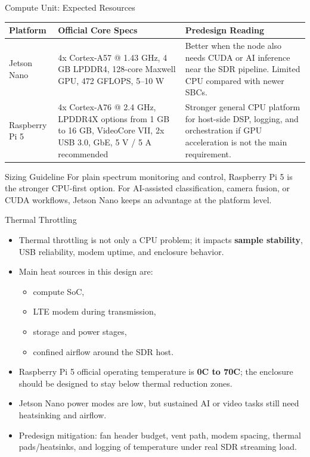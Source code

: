 \documentclass{beamer}
\begin{document}
\begin{frame}{Compute Unit: Expected Resources}
    \scriptsize
    \begin{tabularx}{\textwidth}{>{\raggedright\arraybackslash}p{} >{\raggedright\arraybackslash}p{} X}
        \toprule
        \textbf{Platform} & \textbf{Official Core Specs} & \textbf{Predesign Reading} \\
        \midrule
        Jetson Nano & 4x Cortex-A57 @ 1.43 GHz, 4 GB LPDDR4, 128-core Maxwell GPU, 472 GFLOPS, 5--10 W & Better when the node also needs CUDA or AI inference near the SDR pipeline. Limited CPU compared with newer SBCs. \\
        Raspberry Pi 5 & 4x Cortex-A76 @ 2.4 GHz, LPDDR4X options from 1 GB to 16 GB, VideoCore VII, 2x USB 3.0, GbE, 5 V / 5 A recommended & Stronger general CPU platform for host-side DSP, logging, and orchestration if GPU acceleration is not the main requirement. \\
        \bottomrule
    \end{tabularx}

    \vspace{0.5em}

    \begin{block}{Sizing Guideline}
        For plain spectrum monitoring and control, Raspberry Pi 5 is the stronger CPU-first option. For AI-assisted classification, camera fusion, or CUDA workflows, Jetson Nano keeps an advantage at the platform level.
    \end{block}
\end{frame}

\begin{frame}{Thermal Throttling}
    \small
    \begin{itemize}
        \item Thermal throttling is not only a CPU problem; it impacts \textbf{sample stability}, USB reliability, modem uptime, and enclosure behavior.
        \item Main heat sources in this design are:
        \begin{itemize}
            \item compute SoC,
            \item LTE modem during transmission,
            \item storage and power stages,
            \item confined airflow around the SDR host.
        \end{itemize}
        \item Raspberry Pi 5 official operating temperature is \textbf{0\textdegree C to 70\textdegree C}; the enclosure should be designed to stay below thermal reduction zones.
        \item Jetson Nano power modes are low, but sustained AI or video tasks still need heatsinking and airflow.
        \item Predesign mitigation: fan header budget, vent path, modem spacing, thermal pads/heatsinks, and logging of temperature under real SDR streaming load.
    \end{itemize}
\end{frame}
\end{document}
